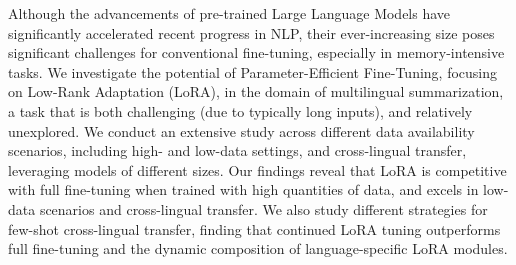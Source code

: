 Although the advancements of pre-trained Large Language Models have significantly accelerated recent progress in NLP, their ever-increasing size poses significant challenges for conventional fine-tuning, especially in memory-intensive tasks. We investigate the potential of Parameter-Efficient Fine-Tuning, focusing on Low-Rank Adaptation (LoRA), in the domain of multilingual summarization, a task that is both challenging (due to typically long inputs), and relatively unexplored.  We conduct an extensive study across different data availability scenarios, including high- and low-data settings, and cross-lingual transfer, leveraging models of different sizes. Our findings reveal that LoRA is competitive with full fine-tuning when trained with high quantities of data, and excels in low-data scenarios and cross-lingual transfer. We also study different strategies for few-shot cross-lingual transfer, finding that continued LoRA tuning outperforms full fine-tuning and the dynamic composition of language-specific LoRA modules.